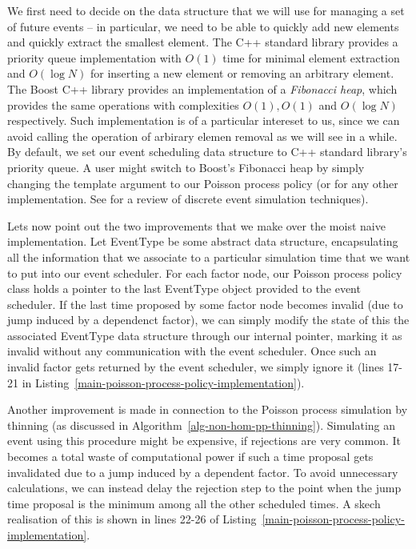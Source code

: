 \documentclass[report.tex]{subfiles}
\begin{document}
We first need to decide on the data structure that we will use for managing
a set of future events -- in particular, we need to be able to quickly
add new elements and quickly extract the smallest element. The C++ standard
library provides a priority queue implementation with $O(1)$ time for
minimal element extraction and $O(\log N)$ for inserting a new element
or removing an arbitrary element. The Boost C++ library \cite{boost-library}
provides an implementation of a \textit{Fibonacci heap}, which provides the
same operations with complexities $O(1), O(1)$ and $O(\log N)$ respectively.
Such implementation is of a particular intereset to us, since we can avoid
calling the operation of arbirary elemen removal as we will see in a while.
By default, we set our event scheduling data structure to C++ standard library's
priority queue. A user might switch to Boost's Fibonacci heap by simply changing
the template argument to our Poisson process policy (or for any other implementation.
See \citet[Chapter XIV Section 5]{devroye2013non} for a review of discrete event simulation techniques).

Lets now point out the two improvements that we make over the moist naive
implementation.
Let EventType be some abstract data structure, encapsulating all the
information that we associate to a particular simulation time that
we want to put into our event scheduler.
For each factor node, our Poisson process policy class holds a pointer
to the last EventType object provided to the event scheduler.
If the last time proposed by some factor node becomes invalid (due
to jump induced by a dependenct factor), we can simply modify the
state of this the associated EventType data structure through our internal pointer,
marking it as invalid without any communication with the event scheduler.
Once such an invalid factor gets returned by the event scheduler, we simply ignore it
(lines 17-21 in Listing~\ref{main-poisson-process-policy-implementation}).

Another improvement is made in connection to the Poisson process simulation
by thinning (as discussed in Algorithm~\ref{alg-non-hom-pp-thinning}).
Simulating an event using this procedure might be expensive, if rejections
are very common. It becomes a total waste of computational power if such a time proposal
gets invalidated due to a jump induced by a dependent factor.
To avoid unnecessary calculations, we can instead delay the
rejection step to the point when the jump time proposal is the minimum among
all the other scheduled times.
A skech realisation of this is shown in lines 22-26 of Listing~\ref{main-poisson-process-policy-implementation}.
\end{document}
